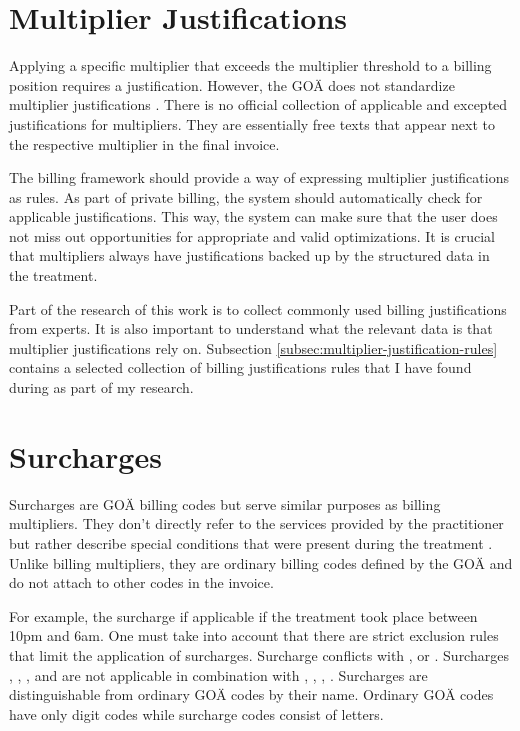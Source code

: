 \section{Multiplier Justifications}\label{sec:multiplier-justifications}
Applying a specific multiplier that exceeds the multiplier threshold to a billing position requires a justification.
However, the GOÄ does not standardize multiplier justifications \cite[]{bruck1998kommentar}.
There is no official collection of applicable and excepted justifications for multipliers.
They are essentially free texts that appear next to the respective multiplier in the final invoice.

The billing framework should provide a way of expressing multiplier justifications as rules.
As part of private billing, the system should automatically check for applicable justifications.
This way, the system can make sure that the user does not miss out opportunities for appropriate and valid optimizations.
It is crucial that multipliers always have justifications backed up by the structured data in the treatment.

Part of the research of this work is to collect commonly used billing justifications from experts.
It is also important to understand what the relevant data is that multiplier justifications rely on.
Subsection \ref{subsec:multiplier-justification-rules} contains a selected collection of billing justifications rules that I have found during as part of my research.

\section{Surcharges}\label{sec:surcharges}
Surcharges are GOÄ billing codes but serve similar purposes as billing multipliers.
They don't directly refer to the services provided by the practitioner but rather describe special conditions that were present during the treatment \cite{walter2008abrechnung}.
Unlike billing multipliers, they are ordinary billing codes defined by the GOÄ and do not attach to other codes in the invoice.

For example, the surcharge  if applicable if the treatment took place between 10pm and 6am.
One must take into account that there are strict exclusion rules that limit the application of surcharges\cite{kommentar2012zuschlage}.
Surcharge  conflicts with ,  or .
Surcharges , , ,  and  are not applicable in combination with , , ,  \cite{kommentar2012zuschlage}.
Surcharges are distinguishable from ordinary GOÄ codes by their name.
Ordinary GOÄ codes have only digit codes while surcharge codes consist of letters.

